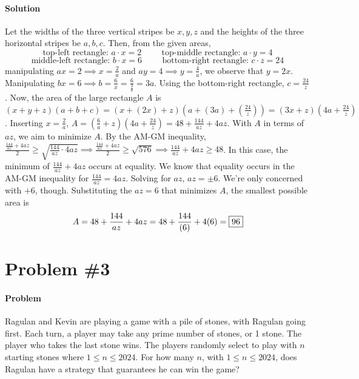 \documentclass[10pt]{article}
\theoremstyle{plain}
\theoremstyle{definition}
\theoremstyle{remark}
\begin{document}
\paragraph{Solution} Let the widths of the three vertical stripes be \(x,y,z\) and the heights of the three horizontal stripes be \(a,b,c\). Then, from the given areas,
\[\text{top-left rectangle: }a\cdot x=2\hspace{1cm}\text{top-middle rectangle: }a\cdot y=4\]
\[\text{middle-left rectangle: }b\cdot x=6\hspace{1cm}\text{bottom-right rectangle: }c\cdot z=24\]
manipulating \(ax=2\implies x=\frac{2}{a}\) and \(ay=4\implies y=\frac{4}{a}\), we observe that \(y=2x\). Manipulating \(bx=6\implies b=\frac{6}{x}=\frac{6}{\frac{2}{a}}=3a\). Using the bottom-right rectangle, \(c=\frac{24}{z}\). Now, the area of the large rectangle \(A\) is \((x+y+z)(a+b+c)=\left(x+\left(2x\right)+z\right)\left(a+\left(3a\right)+\left(\frac{24}{z}\right)\right)=(3x+z)(4a+\frac{24}{z})\). Inserting \(x=\frac{2}{a}\), \(A=\left(\frac{6}{a}+z\right)\left(4a+\frac{24}{z}\right)=48+\frac{144}{az}+4az\). With \(A\) in terms of \(az\), we aim to minimize \(A\). By the AM-GM inequality, \(\frac{\frac{144}{az}+4az}{2}\geq\sqrt{\frac{144}{az}\cdot 4az}\implies\frac{\frac{144}{az}+4az}{2}\geq\sqrt{576}\implies\frac{144}{az}+4az\geq 48\). In this case, the minimum of \(\frac{144}{az}+4az\) occurs at equality. We know that equality occurs in the AM-GM inequality for \(\frac{144}{az}=4az\). Solving for \(az\), \(az=\pm6\). We're only concerned with \(+6\), though. Substituting the \(az=6\) that minimizes \(A\), the smallest possible area is \[A=48+\frac{144}{az}+4az=48+\frac{144}{(6)}+4(6)=\fbox{96}\]

\section{Problem \#3}

\paragraph{Problem} Ragulan and Kevin are playing a game with a pile of stones, with Ragulan going first. Each turn, a player may take any prime number of stones, or 1 stone. The player who takes the last stone wins. The players randomly select to play with \(n\) starting stones where \(1\leq n\leq 2024\). For how many \(n\), with \(1\leq n\leq 2024\), does Ragulan have a strategy that guarantees he can win the game?
\end{document}
